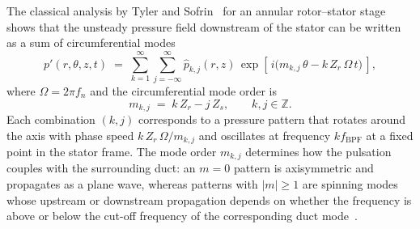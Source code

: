 The classical analysis by Tyler and Sofrin~\cite{Tyler1962} for an annular rotor--stator stage shows that the unsteady pressure field downstream of the stator can be written as a sum of circumferential modes
\begin{equation}
    p'(r,\theta,z,t) \;=\; \sum_{k=1}^{\infty}\sum_{j=-\infty}^{\infty}
      \hat{p}_{k,j}(r,z)\,
      \exp\!\left[\, i\bigl(m_{k,j}\,\theta - k\,Z_r\,\Omega\,t\bigr)\,\right],
    \label{eq:tyler_sofrin_expansion}
\end{equation}
where $\Omega = 2\pi f_n$ and the circumferential mode order is
\begin{equation}
    m_{k,j} \;=\; k\,Z_r - j\,Z_s, \qquad k,j \in \mathbb{Z}.
    \label{eq:tyler_sofrin}
\end{equation}
Each combination $(k,j)$ corresponds to a pressure pattern that rotates around the axis with phase speed $k\,Z_r\,\Omega/m_{k,j}$ and oscillates at frequency $k f_{\mathrm{BPF}}$ at a fixed point in the stator frame. The mode order $m_{k,j}$ determines how the pulsation couples with the surrounding duct: an $m=0$ pattern is axisymmetric and propagates as a plane wave, whereas patterns with $|m|\geq 1$ are spinning modes whose upstream or downstream propagation depends on whether the frequency is above or below the cut-off frequency of the corresponding duct mode~\cite{Morse1968}.
 

